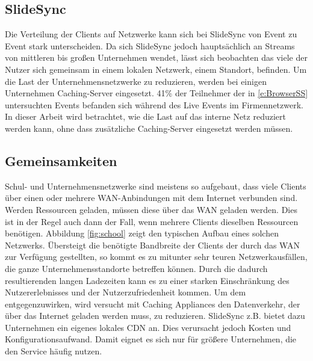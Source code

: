 \subsection{SlideSync}
Die Verteilung der Clients auf Netzwerke kann sich bei SlideSync von Event zu Event stark unterscheiden. Da sich SlideSync jedoch hauptsächlich an Streams von mittleren bis großen Unternehmen wendet, lässt sich beobachten das viele der Nutzer sich gemeinsam in einem lokalen Netzwerk, einem Standort, befinden. Um die Last der Unternehmensnetzwerke zu reduzieren, werden bei einigen Unternehmen Caching-Server eingesetzt. 41\% der Teilnehmer der in \ref{e:BrowserSS} untersuchten Events befanden sich während des Live Events im Firmennetzwerk. In dieser Arbeit wird betrachtet, wie die Last auf das interne Netz reduziert werden kann, ohne dass zusätzliche Caching-Server eingesetzt werden müssen.

\subsection{Gemeinsamkeiten}

Schul- und Unternehmensnetzwerke sind meistens so aufgebaut, dass viele Clients über einen oder mehrere WAN-Anbindungen mit dem Internet verbunden sind. Werden Ressourcen geladen, müssen diese über das WAN geladen werden. Dies ist in der Regel auch dann der Fall, wenn mehrere Clients dieselben Ressourcen benötigen. Abbildung \ref{fig:school} zeigt den typischen Aufbau eines solchen Netzwerks. Übersteigt die benötigte Bandbreite der Clients der durch das WAN zur Verfügung gestellten, so kommt es zu mitunter sehr teuren Netzwerkausfällen, die ganze Unternehmensstandorte betreffen können. Durch die dadurch resultierenden langen Ladezeiten kann es zu einer starken Einschränkung des Nutzererlebnisses und der Nutzerzufriedenheit kommen.\cite{userWaitingTime} Um dem entgegenzuwirken, wird versucht mit Caching Appliances den Datenverkehr, der über das Internet geladen werden muss, zu reduzieren. SlideSync z.B. bietet dazu Unternehmen ein eigenes lokales CDN an. Dies verursacht jedoch Kosten und Konfigurationsaufwand. Damit eignet es sich nur für größere Unternehmen, die den Service häufig nutzen.

